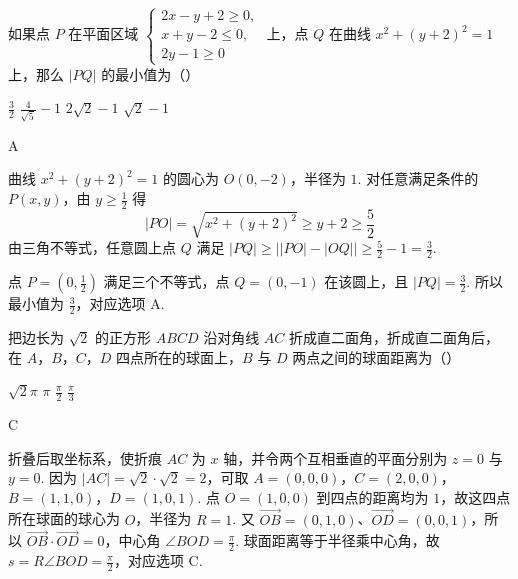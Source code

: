 \begin{problem}
如果点 \(P\) 在平面区域 \(\begin{cases}
2x - y + 2 \geqslant 0,\\
x + y - 2 \leqslant 0,\\
2y - 1 \geqslant 0
\end{cases}\) 上，点 \(Q\) 在曲线 \(x^{2} + (y + 2)^{2} = 1\) 上，那么 \( \left|PQ\right| \) 的最小值为（\quad）

\choices
    {\(\frac{3}{2}\)}
    {\(\frac{4}{\sqrt{5}} - 1\)}
    {\(2\sqrt{2} - 1\)}
    {\(\sqrt{2} - 1\)}
\end{problem}

\begin{answer}
A
\end{answer}

\begin{solution}
曲线 \(x^{2}+(y+2)^{2}=1\) 的圆心为 \(O(0,-2)\)，半径为 \(1\). 对任意满足条件的
\(P(x,y)\)，由 \(y\geqslant\frac12\) 得
\[
|PO|=\sqrt{x^{2}+(y+2)^{2}}\geqslant y+2\geqslant\frac52
\]
由三角不等式，任意圆上点 \(Q\) 满足
\(\left|PQ\right|\geqslant\bigl||PO|-|OQ|\bigr|\geqslant\frac52-1=\frac32\).

点 \(P=\left(0,\frac12\right)\) 满足三个不等式，点 \(Q=(0,-1)\) 在该圆上，且
\(\left|PQ\right|=\frac32\). 所以最小值为 \(\frac32\)，对应选项 A.
\end{solution}

\begin{problem}
把边长为 \(\sqrt{2}\) 的正方形 \(ABCD\) 沿对角线 \(AC\) 折成直二面角，折成直二面角后，在 \(A\)，\(B\)，\(C\)，\(D\) 四点所在的球面上，\(B\) 与 \(D\) 两点之间的球面距离为（\quad）

\choices
    {\(\sqrt{2}\pi\)}
    {\(\pi\)}
    {\(\frac{\pi}{2}\)}
    {\(\frac{\pi}{3}\)}
\end{problem}

\begin{answer}
C
\end{answer}

\begin{solution}
折叠后取坐标系，使折痕 \(AC\) 为 \(x\) 轴，并令两个互相垂直的平面分别为
\(z=0\) 与 \(y=0\). 因为 \(|AC|=\sqrt2\cdot\sqrt2=2\)，可取
\(A=(0,0,0)\)，\(C=(2,0,0)\)，\(B=(1,1,0)\)，\(D=(1,0,1)\).
点 \(O=(1,0,0)\) 到四点的距离均为 \(1\)，故这四点所在球面的球心为 \(O\)，半径为
\(R=1\). 又
\(\overrightarrow{OB}=(0,1,0)\)、\(\overrightarrow{OD}=(0,0,1)\)，所以
\(\overrightarrow{OB}\cdot\overrightarrow{OD}=0\)，中心角 \(\angle BOD=\frac\pi2\).
球面距离等于半径乘中心角，故
\(s=R\angle BOD=\frac\pi2\)，对应选项 C.
\end{solution}

